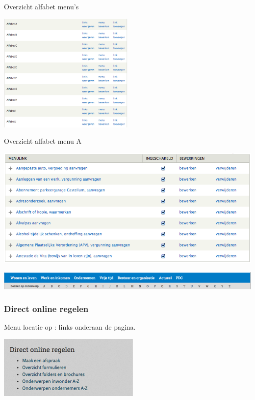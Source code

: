 \bigskip

Overzicht alfabet menu's

\begin{center}
\includegraphics[width=0.5\textwidth]{img/menus_alfabet.png}
\end{center}

Overzicht alfabet menu A

\begin{center}
\includegraphics[width=\textwidth]{img/menu_alfabet_a.png}
\end{center}

\begin{center}
\includegraphics[width=\textwidth]{img/menu3.png}
\end{center}

\bigskip

\subsubsection{Direct online regelen}\label{directonlineregelen}
Menu locatie op \drupalpath{}: links onderaan de pagina.
\bigskip

\begin{center}
	\includegraphics[width=\textwidth]{img/menu_directonline.png}
\end{center}

